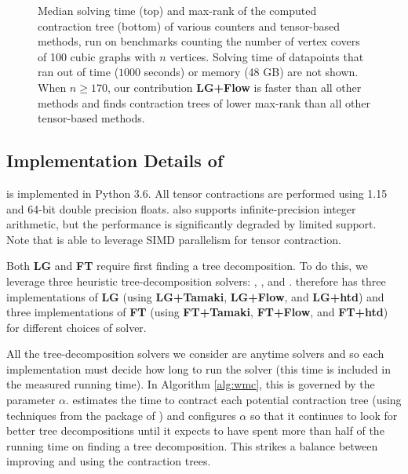 \begin{figure}
	\centering
	
	
	\caption{\label{fig:cubic-time} Median solving time (top) and max-rank of the computed contraction tree (bottom) of various counters and tensor-based methods, run on benchmarks counting the number of vertex covers of 100 cubic graphs with $n$ vertices. Solving time of datapoints that ran out of time ($1000$ seconds) or memory (48 GB) are not shown. When $n \geq 170$, our contribution \textbf{LG+Flow} is faster than all other methods and finds contraction trees of lower max-rank than all other tensor-based methods.}
\end{figure}

\subsection{Implementation Details of }
\label{sec:tensors:experiments:implementation}
 is implemented in Python 3.6. All tensor contractions are performed using  1.15 and 64-bit double precision floats.  also supports infinite-precision integer arithmetic, but the performance is significantly degraded by limited  support. Note that  is able to leverage SIMD parallelism for tensor contraction.

Both \textbf{LG} and \textbf{FT} require first finding a tree decomposition. To do this, we leverage three heuristic tree-decomposition solvers:  \cite{Tamaki17},  \cite{HS18}, and  \cite{AMW17}.  therefore has three implementations of \textbf{LG} (using \textbf{LG+Tamaki}, \textbf{LG+Flow}, and \textbf{LG+htd}) and three implementations of \textbf{FT} (using \textbf{FT+Tamaki}, \textbf{FT+Flow}, and \textbf{FT+htd}) for different choices of solver.

All the tree-decomposition solvers we consider are anytime solvers and so each implementation must decide how long to run the solver (this time is included in the measured running time). 
In Algorithm \ref{alg:wmc}, this is governed by the parameter $\alpha$.
 estimates the time to contract each potential contraction tree (using techniques from the  package of ) and configures $\alpha$ so that it continues to look for better tree decompositions until it expects to have spent more than half of the running time on finding a tree decomposition.  This strikes a balance between improving and using the contraction trees.

